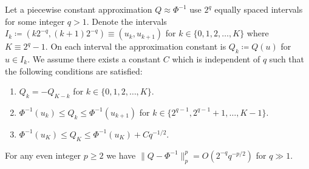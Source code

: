 \documentclass[manuscript,review]{acmart}
\begin{document}
\begin{theorem}
\label{thm:piecewise_constant_approximation_error}
Let a piecewise constant approximation $ Q \approx \Phi^{-1} $ use $ 2^q $ equally spaced intervals for some integer $ q > 1 $. Denote the intervals $ I_k \coloneqq (k2^{-q}, (k+1)2^{-q}) \equiv (u_k, u_{k+1}) $ for $ k \in \{0, 1, 2, \ldots, K\} $ where $ K \equiv 2^q - 1 $. On each interval the approximation constant is $ Q_k \coloneqq Q(u) $ for $ u \in I_k $. We assume there exists a constant $ C $ which is independent of $ q $ such that the following conditions are satisfied:
\begin{enumerate}
\item \label{con:symmetry} $ Q_k = -Q_{K-k} $ for $ k \in \{0,1,2,\ldots,K\} $. 
\item \label{con:intermediate_values} $ \Phi^{-1}(u_k) \leq Q_k \leq \Phi^{-1}(u_{k+1}) $ for $ k \in \{2^{q-1}, 2^{q-1} + 1, \ldots, K-1\} $.
\item \label{con:bounded_asymptotic_growth} $ \Phi^{-1}(u_K) \leq Q_K \leq \Phi^{-1}(u_K) + Cq^{-1/2} $.
\end{enumerate}
For any even integer $ p \geq 2 $ we have $ \lVert  Q - \Phi^{-1} \rVert_p^p = O(2^{-q}q^{-p/2})$ for $ q \gg 1 $.
\end{theorem}
\end{document}

